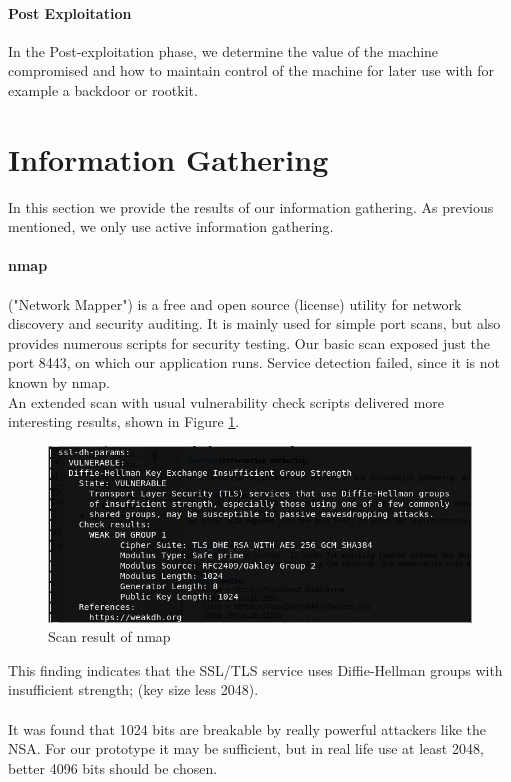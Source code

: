 \documentclass{scrreprt}
\begin{document}
\paragraph{Post Exploitation}
In the Post-exploitation phase, we determine the value of the machine compromised and how to maintain control of the machine for later use with for example a backdoor or rootkit.

\pagebreak
\section{Information Gathering}

In this section we provide the results of our information gathering. As previous mentioned, we only use active information gathering.

\paragraph{nmap} 
("Network Mapper") is a free and open source (license) utility for network discovery and security auditing. It is mainly used for simple port scans, but also provides numerous scripts for security testing.
Our basic scan exposed just the port 8443, on which our application runs. Service detection failed, since it is not known by nmap. \\
An extended scan with usual vulnerability check scripts delivered more interesting results, shown in Figure \ref{nmap}.
\begin{figure}[h!]
	\centering
	\includegraphics[width=15cm]{report/nmap_vul.jpg}
	\caption{Scan result of nmap}
	\label{nmap}
\end{figure}
\noindent This finding indicates that the SSL/TLS service uses Diffie-Hellman groups with insufficient strength; (key size less 2048). \\
 \\
It was found that 1024 bits are breakable by really powerful attackers like the NSA. For our prototype it may be sufficient, but in real life use at least 2048, better 4096 bits should be chosen.
\end{document}
